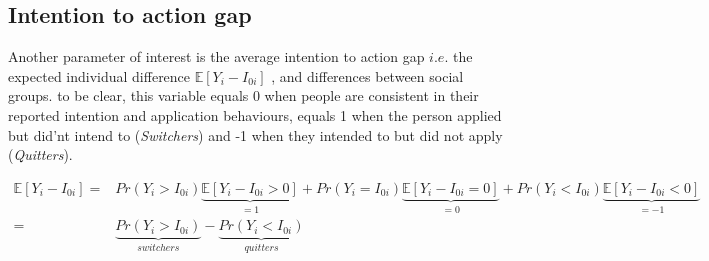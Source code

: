 \documentclass[
]{article}
\newcommand{\esp}[1]{\mathds{E}[ #1 ]}
\theoremstyle{definition}
\theoremstyle{definition}
\theoremstyle{definition}
\theoremstyle{definition}
\theoremstyle{remark}
\begin{document}
\subsection{Intention to action gap}\label{intention-to-action-gap}

Another parameter of interest is the average intention to action gap \(i.e.\) the expected individual difference \(\esp{Y_i-I_{0i}}\) , and differences between social groups. to be clear, this variable equals 0 when people are consistent in their reported intention and application behaviours, equals 1 when the person applied but did'nt intend to (\emph{Switchers}) and -1 when they intended to but did not apply (\emph{Quitters}).

\[
\begin{aligned}
\esp{Y_i-I_{0i}}=&Pr(Y_i>I_{0i})\underbrace{\esp{Y_i-I_{0i}>0}}_{=1}+Pr(Y_i=I_{0i})\underbrace{\esp{Y_i-I_{0i}=0}}_{=0}+Pr(Y_i<I_{0i})\underbrace{\esp{Y_i-I_{0i}<0}}_{=-1}\\
=&\underbrace{Pr(Y_i>I_{0i})}_{switchers}-\underbrace{Pr(Y_i<I_{0i})}_{quitters}
\end{aligned}
\]
\end{document}
